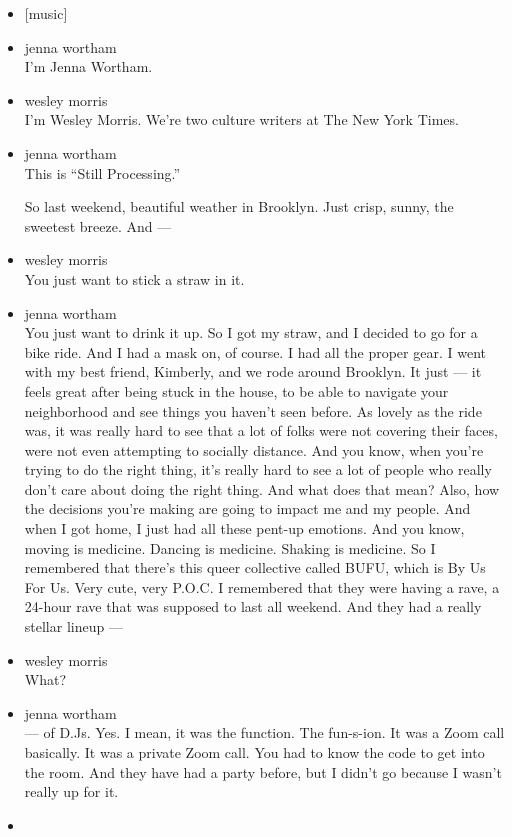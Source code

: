 \begin{itemize}
\item
  {[}music{]}
\item
  jenna wortham\\
  I'm Jenna Wortham.
\item
  wesley morris\\
  I'm Wesley Morris. We're two culture writers at The New York Times.
\item
  jenna wortham\\
  This is ``Still Processing.''

  So last weekend, beautiful weather in Brooklyn. Just crisp, sunny, the
  sweetest breeze. And ---
\item
  wesley morris\\
  You just want to stick a straw in it.
\item
  jenna wortham\\
  You just want to drink it up. So I got my straw, and I decided to go
  for a bike ride. And I had a mask on, of course. I had all the proper
  gear. I went with my best friend, Kimberly, and we rode around
  Brooklyn. It just --- it feels great after being stuck in the house,
  to be able to navigate your neighborhood and see things you haven't
  seen before. As lovely as the ride was, it was really hard to see that
  a lot of folks were not covering their faces, were not even attempting
  to socially distance. And you know, when you're trying to do the right
  thing, it's really hard to see a lot of people who really don't care
  about doing the right thing. And what does that mean? Also, how the
  decisions you're making are going to impact me and my people. And when
  I got home, I just had all these pent-up emotions. And you know,
  moving is medicine. Dancing is medicine. Shaking is medicine. So I
  remembered that there's this queer collective called BUFU, which is By
  Us For Us. Very cute, very P.O.C. I remembered that they were having a
  rave, a 24-hour rave that was supposed to last all weekend. And they
  had a really stellar lineup ---
\item
  wesley morris\\
  What?
\item
  jenna wortham\\
  --- of D.Js. Yes. I mean, it was the function. The fun-s-ion. It was a
  Zoom call basically. It was a private Zoom call. You had to know the
  code to get into the room. And they have had a party before, but I
  didn't go because I wasn't really up for it.
\item

\end{itemize}
